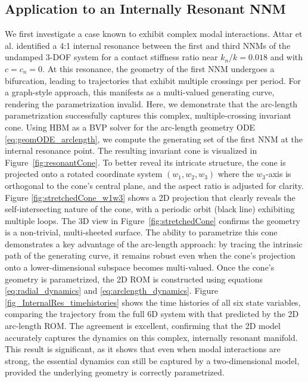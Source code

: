 \documentclass[a4paper,9pt,parskip=half,english]{article}
\theoremstyle{plain}
\theoremstyle{definition}
\begin{document}
\subsection{Application to an Internally Resonant NNM}
We first investigate a case known to exhibit complex modal interactions. Attar et al. identified a 4:1 internal resonance between the first and third NNMs of the undamped 3-DOF system for a contact stiffness ratio near $k_n/k=0.018$ and with $c=c_n=0$. At this resonance, the geometry of the first NNM undergoes a bifurcation, leading to trajectories that exhibit multiple crossings per period. For a graph-style approach, this manifests as a multi-valued generating curve, rendering the parametrization invalid. Here, we demonstrate that the arc-length parametrization successfully captures this complex, multiple-crossing invariant cone. Using HBM as a BVP solver for the arc-length geometry ODE \eqref{eq:geomODE_arclength}, we compute the generating set of the first NNM at the internal resonance point. The resulting invariant cone is visualized in Figure~\ref{fig:resonantCone}. To better reveal its intricate structure, the cone is projected onto a rotated coordinate system $(w_1,w_2,w_3)$ where the $w_3$-axis is orthogonal to the cone's central plane, and the aspect ratio is adjusted for clarity. Figure \ref{fig:stretchedCone_w1w3} shows a 2D projection that clearly reveals the self-intersecting nature of the cone, with a periodic orbit (black line) exhibiting multiple loops. The 3D view in Figure~\ref{fig:stretchedCone} confirms the geometry is a non-trivial, multi-sheeted surface. The ability to parametrize this cone demonstrates a key advantage of the arc-length approach: by tracing the intrinsic path of the generating curve, it remains robust even when the cone's projection onto a lower-dimensional subspace becomes multi-valued.
Once the cone's geometry is parametrized, the 2D ROM is constructed using equations \eqref{eq:radial_dynamics} and \eqref{eq:arclength_dynamics}. Figure \ref{fig_InternalRes_timehistories} shows the time histories of all six state variables, comparing the trajectory from the full 6D system with that predicted by the 2D arc-length ROM. The agreement is excellent, confirming that the 2D model accurately captures the dynamics on this complex, internally resonant manifold. This result is significant, as it shows that even when modal interactions are strong, the essential dynamics can still be captured by a two-dimensional model, provided the underlying geometry is correctly parametrized.
\end{document}
